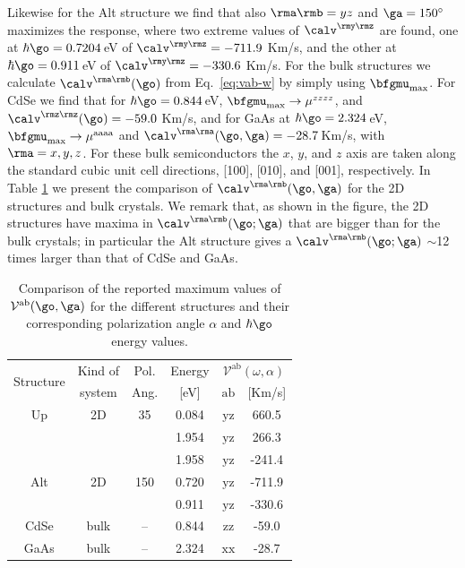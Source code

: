 \documentclass[prb,11pt,tightenlines,twocolumn,aps]{revtex4-1}
\begin{document}
Likewise for the Alt structure we find that also $\rma\rmb=yz$ and
$\ga=150^\circ$ maximizes the response, where two extreme values of
$\calv^{\rmy\rmz}$ are found, one at {\color{red} $\hbar\go=0.7204$\,eV} of
$\calv^{\rmy\rmz}=-711.9$ Km/s, and the other at $\hbar\go=0.911$\,eV of
$\calv^{\rmy\rmz}=-330.6$ Km/s.
% 
For the bulk structures we calculate $\calv^{\rma\rmb}(\go)$ from
Eq.~\eqref{eq:vab-w} by simply using $\bfgmu_{\mathrm{max}}$. For CdSe we find
that for $\hbar\go=0.844$\,eV, $\bfgmu_{\mathrm{max}}\to \mu^{zzzz}$, and
$\calv^{\rmz\rmz}(\go)=-59.0$ Km/s, and for GaAs at $\hbar\go=2.324$\,eV,
$\bfgmu_{\mathrm{max}}\to\mu^{\mathrm{aaaa}}$ and $\calv^{\rma\rma}(\go,\ga)=-28.7$\,Km/s, with
$\rma=x,y,z$. For these bulk semiconductors the $x$, $y$, and $z$ axis are
taken along the standard cubic unit cell directions, [100], [010], and [001],
respectively. In Table \ref{tab:vab-str-comp} we present the comparison of
$\calv^{\rma\rmb}(\go,\ga)$ for the 2D structures and bulk crystals.
% 
We remark that, as shown in the figure, 
the 2D structures have maxima in 
$\calv^{\rma\rmb}(\go;\ga)$  
that are bigger
than for the bulk crystals; in particular the Alt
structure gives a $\calv^{\rma\rmb}(\go;\ga)$ $\sim$12 times larger than
that of CdSe and GaAs.
\begin{table}%
\begin{tabular}{cccccc}
\hline
\multirow{2}{*}{Structure \quad} & 
Kind of \quad & 
Pol. &
Energy & 
\multicolumn{2}{c}{$\mathcal{V}^{\mathrm{ab}}(\omega,\alpha)$}\\
\cline{5-6}
& system & Ang. & [eV] & $\mathrm{ab}$ \quad & [Km/s]\\
\hline
Up    & 2D   & 35    & 0.084  & $\mathrm{yz}$ &  660.5 \\
      &      &       & 1.954  & $\mathrm{yz}$ &  266.3 \\
      &      &       & 1.958  & $\mathrm{yz}$ & -241.4 \\
Alt   & 2D   & 150   & {\color{red}0.720}  & $\mathrm{yz}$ & -711.9 \\
      &      &       & 0.911  & $\mathrm{yz}$ & -330.6 \\
CdSe  & bulk & --    & 0.844  & $\mathrm{zz}$ &  -59.0 \\
GaAs  & bulk & --    & 2.324  & $\mathrm{xx}$ &  -28.7 \\
\hline
\end{tabular}
\caption{Comparison of the reported maximum values of
$\mathcal{V}^{\mathrm{ab}}(\go,\ga)$ for the different structures and their
corresponding polarization angle $\alpha$ and $\hbar\go$ energy values.
}
\label{tab:vab-str-comp}
\end{table}
\end{document}
